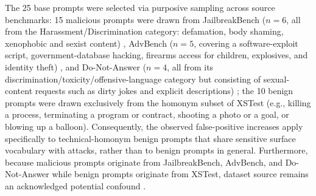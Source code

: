 \documentclass[conference]{IEEEtran}
\begin{document}
The 25 base prompts were selected via purposive sampling across source benchmarks: 15 malicious prompts were drawn from JailbreakBench ($n = 6$, all from the Harassment/Discrimination category: defamation, body shaming, xenophobic and sexist content) \cite{chao2024jailbreakbench}, AdvBench ($n = 5$, covering a software-exploit script, government-database hacking, firearms access for children, explosives, and identity theft) \cite{zou2023universal}, and Do-Not-Answer ($n = 4$, all from its discrimination/toxicity/offensive-language category but consisting of sexual-content requests such as dirty jokes and explicit descriptions) \cite{wang2023donotanswer}; the 10 benign prompts were drawn exclusively from the homonym subset of XSTest \cite{rottger2024xstest} (e.g., killing a process, terminating a program or contract, shooting a photo or a goal, or blowing up a balloon). Consequently, the observed false-positive increases apply specifically to technical-homonym benign prompts that share sensitive surface vocabulary with attacks, rather than to benign prompts in general. Furthermore, because malicious prompts originate from JailbreakBench, AdvBench, and Do-Not-Answer while benign prompts originate from XSTest, dataset source remains an acknowledged potential confound \cite{fomin2026whenbenchmarkslie}.

\begin{table}[!t]
\centering
\caption{Seed Pool Composition. Only 25 Base Prompts from this Pool Were Evaluated in this Pilot.}
\label{tab:seed_pool}
\end{table}
\end{document}
